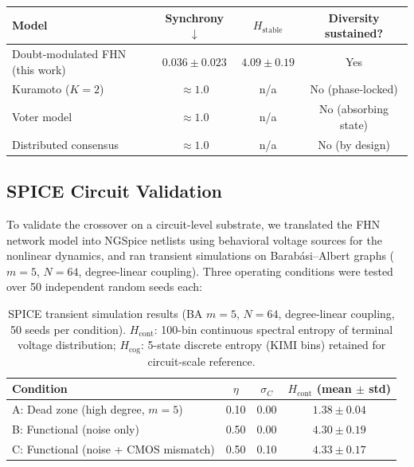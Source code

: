 ﻿\documentclass[11pt]{article}
\begin{document}
\begin{table}[ht]
\begin{tabular}{lccc}
\textbf{Model} & \textbf{Synchrony} $\downarrow$ & $H_{\text{stable}}$ & \textbf{Diversity sustained?} \\
\midrule
Doubt-modulated FHN (this work) & $0.036 \pm 0.023$ & $4.09 \pm 0.19$ & Yes \\
Kuramoto ($K = 2$)              & $\approx 1.0$     & n/a             & No (phase-locked) \\
Voter model                     & $\approx 1.0$     & n/a             & No (absorbing state) \\
Distributed consensus           & $\approx 1.0$     & n/a             & No (by design) \\
\bottomrule
\end{tabular}
\end{table}

\subsection{SPICE Circuit Validation}
\label{sec:spice_validation}

To validate the crossover on a circuit-level substrate, we translated the FHN network model into NGSpice netlists using behavioral voltage sources for the nonlinear dynamics, and ran transient simulations on Barab\'{a}si--Albert graphs ($m = 5$, $N = 64$, degree-linear coupling). Three operating conditions were tested over 50 independent random seeds each:

\begin{table}[ht]
\centering
\caption{SPICE transient simulation results (BA $m=5$, $N=64$, degree-linear coupling, 50 seeds per condition). $H_{\text{cont}}$: 100-bin continuous spectral entropy of terminal voltage distribution; $H_{\text{cog}}$: 5-state discrete entropy (KIMI bins) retained for circuit-scale reference.}
\label{tab:spice_validation}
\begin{tabular}{lccc}
\toprule
\textbf{Condition} & $\eta$ & $\sigma_C$ & $H_{\text{cont}}$ (mean $\pm$ std) \\
\midrule
A: Dead zone (high degree, $m=5$) & 0.10 & 0.00 & $1.38 \pm 0.04$ \\
B: Functional (noise only)                              & 0.50 & 0.00 & $4.30 \pm 0.19$ \\
C: Functional (noise + CMOS mismatch)                  & 0.50 & 0.10 & $4.33 \pm 0.17$ \\
\bottomrule
\end{tabular}
\end{table}
\end{document}

